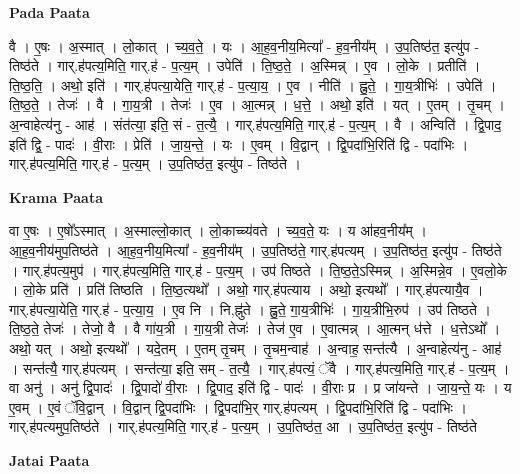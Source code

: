 \documentclass[17pt]{extarticle}
\begin{document}
\textbf{Pada Paata} \newline

वै । ए॒षः । अ॒स्मात् । लो॒कात् । च्य॒व॒ते॒ । यः । आ॒ह॒व॒नीय॒मित्या᳚ - ह॒व॒नीय᳚म् । उ॒प॒तिष्ठ॑त॒ इत्यु॑प - तिष्ठ॑ते । गार्.ह॑पत्य॒मिति॒ गार्.ह॑ - प॒त्य॒म् । उपेति॑ । ति॒ष्ठ॒ते॒ । अ॒स्मिन्न् । ए॒व । लो॒के । प्रतीति॑ । ति॒ष्ठ॒ति॒ । अथो॒ इति॑ । गार्.ह॑पत्या॒येति॒ गार्.ह॑ - प॒त्या॒य॒ । ए॒व । नीति॑ । ह्नु॒ते॒ । गा॒य॒त्रीभिः॑ । उपेति॑ । ति॒ष्ठ॒ते॒ । तेजः॑ । वै । गा॒य॒त्री । तेजः॑ । ए॒व । आ॒त्मन्न् । ध॒त्ते॒ । अथो॒ इति॑ । यत् । ए॒तम् । तृ॒चम् । अ॒न्वाहेत्य॑नु - आह॑ । संत॑त्या॒ इति॒ सं - त॒त्यै॒ । गार्.ह॑पत्य॒मिति॒ गार्.ह॑ - प॒त्य॒म् । वै । अन्विति॑ । द्वि॒पाद॒ इति॑ द्वि॒ - पादः॑ । वी॒राः । प्रेति॑ । जा॒य॒न्ते॒ । यः । ए॒वम् । वि॒द्वान् । द्वि॒पदा॑भि॒रिति॑ द्वि - पदा॑भिः । गार्.ह॑पत्य॒मिति॒ गार्.ह॑ - प॒त्य॒म् । उ॒प॒तिष्ठ॑त॒ इत्यु॑प - तिष्ठ॑ते ।  \newline


\textbf{Krama Paata} \newline

वा ए॒षः । ए॒षो᳚ऽस्मात् । अ॒स्माल्लो॒कात् । लो॒काच्च्य॑वते । च्य॒व॒ते॒ यः । य आ॑हव॒नीय᳚म् । आ॒ह॒व॒नीय॑मुप॒तिष्ठ॑ते । आ॒ह॒व॒नीय॒मित्या᳚ - ह॒व॒नीय᳚म् । उ॒प॒तिष्ठ॑ते॒ गार्.ह॑पत्यम् । उ॒प॒तिष्ठ॑त॒ इत्यु॑प - तिष्ठ॑ते । गार्.ह॑पत्य॒मुप॑ । गार्.ह॑पत्य॒मिति॒ गार्.ह॑ - प॒त्य॒म् । उप॑ तिष्ठते । ति॒ष्ठ॒ते॒ऽस्मिन्न् । अ॒स्मिन्ने॒व । ए॒वलो॒के । लो॒के प्रति॑ । प्रति॑ तिष्ठति । ति॒ष्ठ॒त्यथो᳚ । अथो॒ गार्.ह॑पत्याय । अथो॒ इत्यथो᳚ । गार्.ह॑पत्यायै॒व । गार्.ह॑पत्या॒येति॒ गार्.ह॑ - प॒त्या॒य॒ । ए॒व नि । नि,ह्नु॑ते । ह्नु॒ते॒ गा॒य॒त्रीभिः॑ । गा॒य॒त्रीभि॒रुप॑ । उप॑ तिष्ठते । ति॒ष्ठ॒ते॒ तेजः॑ । तेजो॒ वै । वै गा॑य॒त्री । गा॒य॒त्री तेजः॑ । तेज॑ ए॒व । ए॒वात्मन्न् । आ॒त्मन् ध॑त्ते । ध॒त्तेऽथो᳚ । अथो॒ यत् । अथो॒ इत्यथो᳚ । यदे॒तम् । ए॒तम् तृ॒चम् । तृ॒चम॒न्वाह॑ । अ॒न्वाह॒ सन्त॑त्यै । अ॒न्वाहेत्य॑नु - आह॑ । सन्त॑त्यै॒ गार्.ह॑पत्यम् । सन्त॑त्या॒ इति॒ सम् - त॒त्यै॒ । गार्.ह॑पत्यं॒ ॅवै । गार्.ह॑पत्य॒मिति॒ गार्.ह॑ - प॒त्य॒म् । वा अनु॑ । अनु॑ द्वि॒पादः॑ । द्वि॒पादो॑ वी॒राः । द्वि॒पाद॒ इति॑ द्वि - पादः॑ । वी॒राः प्र । प्र जा॑यन्ते । जा॒य॒न्ते॒ यः । य ए॒वम् । ए॒वं ॅवि॒द्वान् । वि॒द्वान् द्वि॒पदा॑भिः । द्वि॒पदा॑भि॒र् गार्.ह॑पत्यम् । द्वि॒पदा॑भि॒रिति॑ द्वि - पदा॑भिः । गार्.ह॑पत्यमुप॒तिष्ठ॑ते । गार्.ह॑पत्य॒मिति॒ गार्.ह॑ - प॒त्य॒म् । उ॒प॒तिष्ठ॑त॒ आ । उ॒प॒तिष्ठ॑त॒ इत्यु॑प - तिष्ठ॑ते \newline

\textbf{Jatai Paata} \newline
\end{document}
